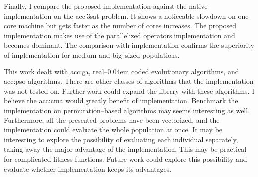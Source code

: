 Finally, I compare the proposed implementation against the native \cpp implementation on the \acrshort{acc:3sat} problem. It shows a noticeable slowdown on one core machine but gets faster as the number of cores increases. The proposed implementation makes use of the parallelized operators implementation and becomes dominant. The comparison with \cpp implementation confirms the superiority of \cuda implementation for medium and big--sized populations.

This work dealt with \acrshort{acc:ga}, real--\kern0.04em coded evolutionary algorithms, and \acrshort{acc:pso} algorithms. There are other classes of algorithms that the implementation was not tested on. Further work could expand the library with these algorithms. I believe the \acrshort{acc:cma} would greatly benefit of \cuda implementation. Benchmark the implementation on permutation--based algorithms may seems interesting as well. Furthermore, all the presented problems have been vectorized, and the \gpu implementation could evaluate the whole population at once. It may be interesting to explore the possibility of evaluating each individual separately, taking away the major advantage of the \gpu implementation. This may be practical for complicated fitness functions. Future work could explore this possibility and evaluate whether \gpu implementation keeps its advantages.